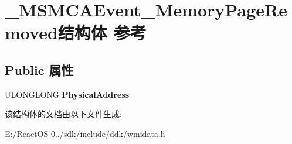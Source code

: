 \hypertarget{struct___m_s_m_c_a_event___memory_page_removed}{}\section{\+\_\+\+M\+S\+M\+C\+A\+Event\+\_\+\+Memory\+Page\+Removed结构体 参考}
\label{struct___m_s_m_c_a_event___memory_page_removed}
\subsection*{Public 属性}
\begin{DoxyCompactItemize}
\item 
\mbox{\label{struct___m_s_m_c_a_event___memory_page_removed_a11c0be5146002df543e10a73dee016c5}} 
U\+L\+O\+N\+G\+L\+O\+NG {\bfseries Physical\+Address}
\end{DoxyCompactItemize}


该结构体的文档由以下文件生成\+:\begin{DoxyCompactItemize}
\item 
E\+:/\+React\+O\+S-\/0../sdk/include/ddk/wmidata.\+h\end{DoxyCompactItemize}
